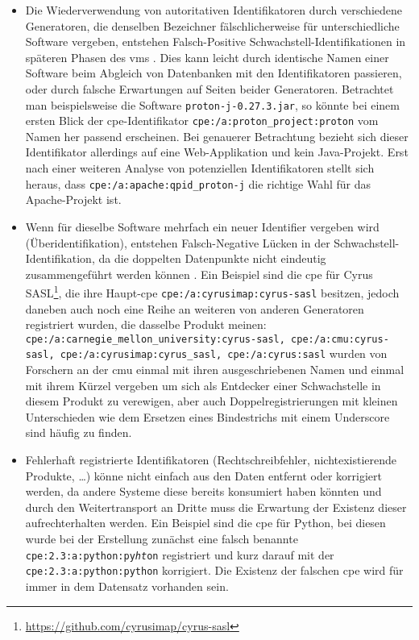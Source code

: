 \begin{itemize}
    \itemsep0em
    \item Die Wiederverwendung von autoritativen Identifikatoren durch verschiedene Generatoren, die denselben Bezeichner fälschlicherweise für unterschiedliche Software vergeben, entstehen Falsch-Positive Schwachstell-Identifikationen in späteren Phasen des \acrshort{vms} \autocite{CISA2023}.
    Dies kann leicht durch identische Namen einer Software beim Abgleich von Datenbanken mit den Identifikatoren passieren, oder durch falsche Erwartungen auf Seiten beider Generatoren.
    Betrachtet man beispielsweise die Software \texttt{proton-j-0.27.3.jar}, so könnte bei einem ersten Blick der \acrshort{cpe}-Identifikator \texttt{cpe:/a:proton\_project:proton} vom Namen her passend erscheinen.
    Bei genauerer Betrachtung bezieht sich dieser Identifikator allerdings auf eine Web-Applikation und kein Java-Projekt.
    Erst nach einer weiteren Analyse von potenziellen Identifikatoren stellt sich heraus, dass \texttt{cpe:/a:apache:qpid\_proton-j} die richtige Wahl für das Apache-Projekt ist.

    \item Wenn für dieselbe Software mehrfach ein neuer Identifier vergeben wird (Überidentifikation), entstehen Falsch-Negative Lücken in der Schwachstell-Identifikation, da die doppelten Datenpunkte nicht eindeutig zusammengeführt werden können \autocite{CISA2023}.
    Ein Beispiel sind die \acrshort{cpe} für Cyrus SASL\footnote{\url{https://github.com/cyrusimap/cyrus-sasl}}, die ihre Haupt-\acrshort{cpe} \texttt{cpe:/a:cyrusimap:cyrus-sasl} besitzen, jedoch daneben auch noch eine Reihe an weiteren von anderen Generatoren registriert wurden, die dasselbe Produkt meinen:
    \texttt{cpe:/a:carnegie\_mellon\_university:cyrus-sasl, cpe:/a:cmu:cyrus-sasl, cpe:/a:cyrusimap:cyrus\_sasl, cpe:/a:cyrus:sasl} wurden von Forschern an der \acrfull{cmu} einmal mit ihren ausgeschriebenen Namen und einmal mit ihrem Kürzel vergeben um sich als Entdecker einer Schwachstelle in diesem Produkt zu verewigen, aber auch Doppelregistrierungen mit kleinen Unterschieden wie dem Ersetzen eines Bindestrichs mit einem Underscore sind häufig zu finden.

    \item Fehlerhaft registrierte Identifikatoren (Rechtschreibfehler, nichtexistierende Produkte, \ldots) könne nicht einfach aus den Daten entfernt oder korrigiert werden, da andere Systeme diese bereits konsumiert haben könnten und durch den Weitertransport an Dritte muss die Erwartung der Existenz dieser aufrechterhalten werden.
    Ein Beispiel sind die \acrshort{cpe} für Python, bei diesen wurde bei der Erstellung zunächst eine falsch benannte \texttt{cpe:2.3:a:python:py\textit{ht}on} registriert und kurz darauf mit der \texttt{cpe:2.3:a:python:python} korrigiert.
    Die Existenz der falschen \acrshort{cpe} wird für immer in dem Datensatz vorhanden sein.


\end{itemize}
